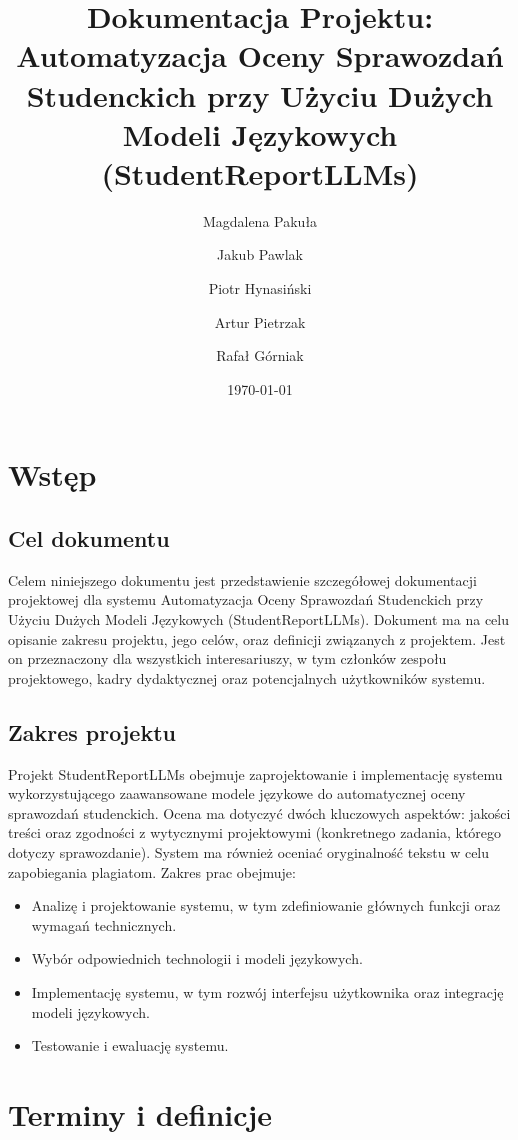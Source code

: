 \documentclass[a4paper, 12pt]{article}
\title{Dokumentacja Projektu: \\ Automatyzacja Oceny Sprawozdań Studenckich przy Użyciu Dużych Modeli Językowych (StudentReportLLMs)}
\author{
    Magdalena Pakuła \and
    Jakub Pawlak \and
    Piotr Hynasiński \and
    Artur Pietrzak \and
    Rafał Górniak
}
\date{\today}
\begin{document}
\maketitle

\newpage
\tableofcontents
\newpage

\section{Wstęp}
\subsection{Cel dokumentu}
Celem niniejszego dokumentu jest przedstawienie szczegółowej dokumentacji projektowej dla systemu Automatyzacja Oceny Sprawozdań Studenckich przy Użyciu Dużych Modeli Językowych (StudentReportLLMs).
Dokument ma na celu opisanie zakresu projektu, jego celów, oraz definicji związanych z projektem.
Jest on przeznaczony dla wszystkich interesariuszy, w tym członków zespołu projektowego, kadry dydaktycznej oraz potencjalnych użytkowników systemu.

\subsection{Zakres projektu}
Projekt StudentReportLLMs obejmuje zaprojektowanie i implementację systemu wykorzystującego zaawansowane modele językowe do automatycznej oceny sprawozdań studenckich.
Ocena ma dotyczyć dwóch kluczowych aspektów: jakości treści oraz zgodności z wytycznymi projektowymi (konkretnego zadania, którego dotyczy sprawozdanie).
System ma również oceniać oryginalność tekstu w celu zapobiegania plagiatom.
Zakres prac obejmuje:

\begin{itemize}
    \item Analizę i projektowanie systemu, w tym zdefiniowanie głównych funkcji oraz wymagań technicznych.
    \item Wybór odpowiednich technologii i modeli językowych.
    \item Implementację systemu, w tym rozwój interfejsu użytkownika oraz integrację modeli językowych.
    \item Testowanie i ewaluację systemu.
\end{itemize}

\section{Terminy i definicje}
\end{document}
